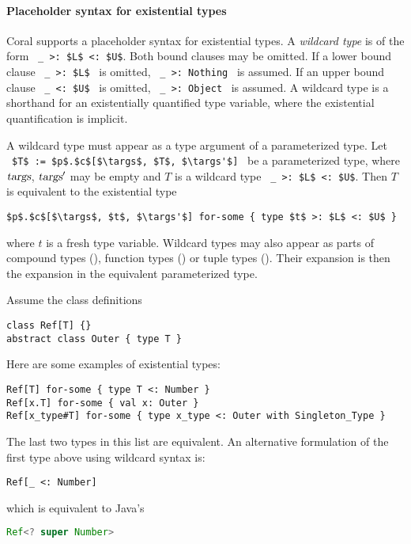 \paragraph{Placeholder syntax for existential types}
Coral supports a placeholder syntax for existential types. A {\em wildcard type} is of the form ~\lstinline!_ >: $L$ <: $U$!. Both bound clauses may be omitted. If a lower bound clause ~\lstinline!_ >: $L$!~ is omitted, ~\lstinline!_ >: Nothing!~ is assumed. If an upper bound clause ~\lstinline!_ <: $U$!~ is omitted, ~\lstinline!_ >: Object!~ is assumed. A wildcard type is a shorthand for an existentially quantified type variable, where the existential quantification is implicit. 

A wildcard type must appear as a type argument of a parameterized type. Let ~\lstinline!$T$ := $p$.$c$[$\targs$, $T$, $\targs'$]!~ be a parameterized type, where $\mbox{\sl targs}$, $\mbox{\sl targs}'$ may be empty and $T$ is a wildcard type ~\lstinline!_ >: $L$ <: $U$!. Then $T$ is equivalent to the existential type
\begin{lstlisting}
$p$.$c$[$\targs$, $t$, $\targs'$] for-some { type $t$ >: $L$ <: $U$ }
\end{lstlisting}
where $t$ is a fresh type variable. Wildcard types may also appear as parts of compound types (), function types () or tuple types (). Their expansion is then the expansion in the equivalent parameterized type. 

\example Assume the class definitions
\begin{lstlisting}
class Ref[T] {}
abstract class Outer { type T }
\end{lstlisting}

Here are some examples of existential types:
\begin{lstlisting}
Ref[T] for-some { type T <: Number }
Ref[x.T] for-some { val x: Outer }
Ref[x_type#T] for-some { type x_type <: Outer with Singleton_Type }
\end{lstlisting}

The last two types in this list are equivalent. An alternative formulation of the first type above using wildcard syntax is:
\begin{lstlisting}
Ref[_ <: Number]
\end{lstlisting}

which is equivalent to Java's
\begin{lstlisting}[language=Java]
Ref<? super Number>
\end{lstlisting}

